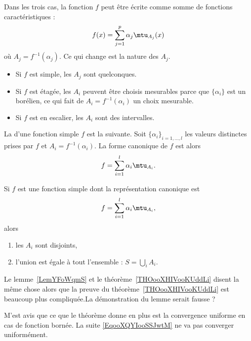 Dans les trois cas, la fonction \( f\) peut être écrite comme somme de fonctions caractéristiques :
\begin{equation}
	f(x)=\sum_{j=1}^p\alpha_j\mtu_{A_j}(x)
\end{equation}
où \( A_j=f^{-1}(\alpha_j)\). Ce qui change est la nature des \( A_j\).

\begin{itemize}
	\item Si \( f\) est  simple, les \( A_j\) sont quelconques.
	\item Si \( f\) est étagée, les \( A_i\) peuvent être choisis mesurables parce que \( \{\alpha_i \}\) est un borélien, ce qui fait de \( A_i=f^{-1}(\alpha_i)\) un choix mesurable.
	\item Si \( f\) est en escalier, les \( A_i\) sont des intervalles.
\end{itemize}

\begin{definition}
	La  d'une fonction simple \( f\) est la suivante. Soit \( \{ \alpha_i \}_{i=1,\ldots, l}\) les valeurs distinctes prises par \( f\) et \( A_i=f^{-1}(\alpha_i)\). La forme canonique de \( f\) est alors
	\begin{equation}
		f=\sum_{i=1}^l\alpha_i\mtu_{A_i}.
	\end{equation}
\end{definition}

\begin{lemma}   \label{LEMooNWLTooCDuRQI}
	Si \( f\) est une fonction simple dont la représentation canonique est
	\begin{equation}
		f=\sum_{i=1}^l\alpha_i\mtu_{A_i},
	\end{equation}
	alors
	\begin{enumerate}
		\item
		      les \( A_i\) sont disjoints,
		\item
		      l'union est égale à tout l'ensemble : \( S=\bigcup_iA_i\).
	\end{enumerate}
\end{lemma}

\begin{probleme}
	Le lemme~\ref{LemYFoWqmS} et le théorème~\ref{THOooXHIVooKUddLi} disent la même chose alors que la preuve du théorème~\ref{THOooXHIVooKUddLi} est beaucoup plus compliquée.La démonstration du lemme serait fausse ?

	M'est avis que ce que le théorème donne en plus est la convergence uniforme en cas de fonction bornée. La suite \eqref{EqooXQYIooSSJwtM} ne va pas converger uniformément.
\end{probleme}

